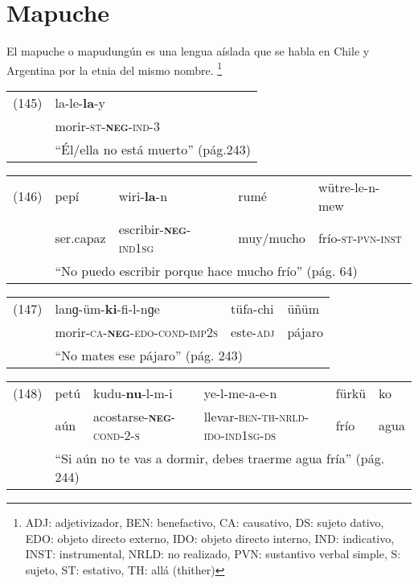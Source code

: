 \section*{Mapuche}

\noindent El mapuche o mapudungún es una lengua aíslada que se habla en Chile y Argentina por la etnia del mismo nombre.
\footnote{ADJ: adjetivizador, BEN: benefactivo, CA: causativo, DS: sujeto dativo, EDO: objeto directo externo, IDO: objeto directo interno, IND: indicativo, INST: instrumental, NRLD: no realizado, PVN: sustantivo verbal simple, S: sujeto, ST: estativo, TH: allá (thither) }
\vspace{0.5cm}

{\setmainfont{Charis SIL} 

\begin{tabular}{ll}
(145) & la-le-\textbf{la}-y \\
& morir-\textsc{st-\textbf{neg}-ind-3}\\
& ``Él/ella no está muerto'' (pág.243)
\end{tabular} \vspace{0.5cm}

\begin{tabular}{lllll}
(146) & pepí & wiri-\textbf{la}-n & rumé & wütre-le-n-mew \\
& ser.capaz & escribir-\textsc{\textbf{neg}-ind1sg} & muy/mucho & frío-\textsc{st-pvn-inst} \\
& \multicolumn{4}{l}{``No puedo escribir porque hace mucho frío'' (pág. 64)}
\end{tabular} \vspace{0.5cm}

\begin{tabular}{llll}
(147) & lanɡ-üm-\textbf{ki}-fi-l-nɡe & tüfa-chi & üñüm \\
& morir-\textsc{ca-\textbf{neg}-edo-cond-imp2s} & este-\textsc{adj} & pájaro \\
& \multicolumn{3}{l}{``No mates ese pájaro'' (pág. 243)}
\end{tabular} \vspace{0.5cm}

{\footnotesize
\begin{tabular}{llllll}
(148) & petú & kudu-\textbf{nu}-l-m-i & ye-l-me-a-e-n & fürkü & ko \\
& aún & acostarse-\textsc{\textbf{neg}-cond-2-s} & llevar-\textsc{ben-th-nrld-ido-ind1sg-ds} & frío & agua \\
& \multicolumn{5}{l}{``Si aún no te vas a dormir, debes traerme agua fría'' (pág. 244)}
\end{tabular} \vspace{0.5cm}}

}
